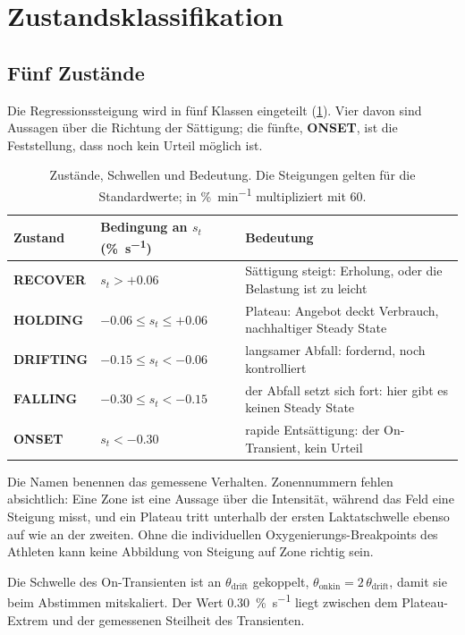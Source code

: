 \documentclass[11pt,a4paper]{article}
\newcommand{\st}[2]{\textcolor{#1}{\textbf{#2}}}
\newcommand{\RECOVER}{\st{recover}{RECOVER}}
\newcommand{\HOLDING}{\st{holding}{HOLDING}}
\newcommand{\DRIFTING}{\st{drifting}{DRIFTING}}
\newcommand{\FALLING}{\st{falling}{FALLING}}
\newcommand{\ONSET}{\st{onset}{ONSET}}
\newcommand{\pers}{\si{\percent\per\second}}
\newcommand{\permin}{\si{\percent\per\minute}}
\begin{document}
\section{Zustandsklassifikation}

\subsection{Fünf Zustände}

Die Regressionssteigung wird in fünf Klassen eingeteilt (\cref{tab:states}).
Vier davon sind Aussagen über die Richtung der Sättigung; die fünfte, \ONSET{},
ist die Feststellung, dass noch kein Urteil möglich ist.

\begin{table}[H]
  \centering\small
  \caption{Zustände, Schwellen und Bedeutung. Die Steigungen gelten für die
    Standardwerte; in \permin{} multipliziert mit 60.}
  \label{tab:states}
  \begin{tabularx}{\textwidth}{@{}llX@{}}
    \toprule
    Zustand & Bedingung an $s_t$ (\pers) & Bedeutung \\
    \midrule
    \RECOVER  & $s_t > +\num{0.06}$ & Sättigung steigt: Erholung, oder die Belastung ist zu leicht \\
    \HOLDING  & $-\num{0.06} \le s_t \le +\num{0.06}$ & Plateau: Angebot deckt Verbrauch, nachhaltiger Steady State \\
    \DRIFTING & $-\num{0.15} \le s_t < -\num{0.06}$ & langsamer Abfall: fordernd, noch kontrolliert \\
    \FALLING  & $-\num{0.30} \le s_t < -\num{0.15}$ & der Abfall setzt sich fort: hier gibt es keinen Steady State \\
    \ONSET    & $s_t < -\num{0.30}$ & rapide Entsättigung: der On-Transient, kein Urteil \\
    \bottomrule
  \end{tabularx}
\end{table}

Die Namen benennen das gemessene Verhalten. Zonennummern fehlen absichtlich:
Eine Zone ist eine Aussage über die Intensität, während das Feld eine Steigung
misst, und ein Plateau tritt unterhalb der ersten Laktatschwelle ebenso auf
wie an der zweiten. Ohne die individuellen Oxygenierungs-Breakpoints des
Athleten kann keine Abbildung von Steigung auf Zone richtig sein.

Die Schwelle des On-Transienten ist an $\theta_{\mathrm{drift}}$ gekoppelt,
$\theta_{\mathrm{onkin}} = 2\,\theta_{\mathrm{drift}}$, damit sie beim
Abstimmen mitskaliert. Der Wert \num{0.30}~\pers{} liegt zwischen dem
Plateau-Extrem und der gemessenen Steilheit des Transienten.
\end{document}
